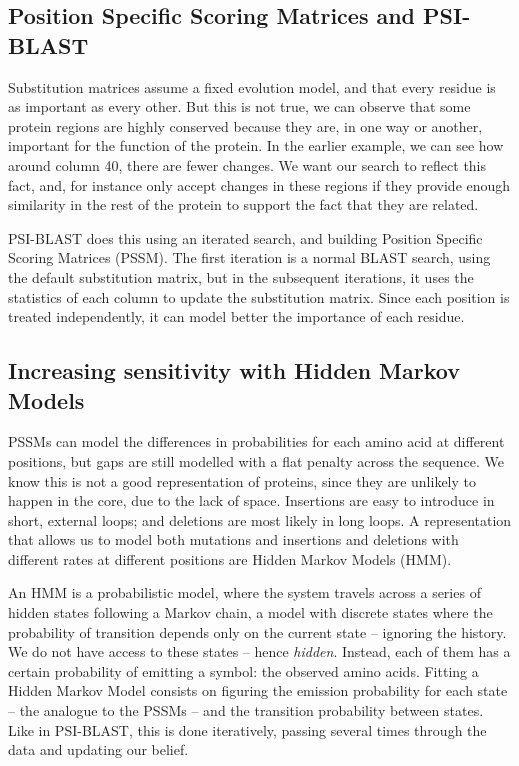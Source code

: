 \subsection[PSSMs and PSI-BLAST]{Position Specific Scoring Matrices and PSI-BLAST}

Substitution matrices assume a fixed evolution model, and that every residue is as important as every other.
But this is not true, we can observe that some protein regions are highly conserved because they are, in one way or another, important for the function of the protein.
In the earlier example, we can see how around column 40, there are fewer changes.
We want our search to reflect this fact, and, for instance only accept changes in these regions if they provide enough similarity in the rest of the protein to support the fact that they are related.

PSI-BLAST does this using an iterated search, and building Position Specific Scoring Matrices (PSSM).
The first iteration is a normal BLAST search, using the default substitution matrix, but in the subsequent iterations, it uses the statistics of each column to update the substitution matrix.
Since each position is treated independently, it can model better the importance of each residue.

\subsection[Hidden Markov Models]{Increasing sensitivity with Hidden Markov Models}
PSSMs can model the differences in probabilities for each amino acid at different positions, but gaps are still modelled with a flat penalty across the sequence.
We know this is not a good representation of proteins, since they are unlikely to happen in the core, due to the lack of space.
Insertions are easy to introduce in short, external loops; and deletions are most likely in long loops. 
A representation that allows us to model both mutations and insertions and deletions with different rates at different positions are Hidden Markov Models (HMM).

An HMM  is a probabilistic model, where the system travels across a series of hidden states following a Markov chain, a model with discrete states where the probability of transition depends only on the current state -- ignoring the history.
We do not have access to these states -- hence \emph{hidden}.
Instead, each of them has a certain probability of emitting a symbol: the observed amino acids.
Fitting a Hidden Markov Model consists on figuring the emission probability for each state -- the analogue to the PSSMs -- and the transition probability between states.
Like in PSI-BLAST, this is done iteratively, passing several times through the data and updating our belief.

